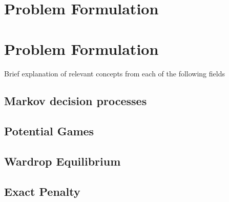 \section{Problem Formulation}\label{problemFormulation}

\section{Problem Formulation}\label{problemFormulation}
Brief explanation of relevant concepts from each of the following fields
\subsection{Markov decision processes}
\subsection{Potential Games}
\subsection{Wardrop Equilibrium}
\subsection{Exact Penalty}

\begin{theorem}\cite[Prop. 5.4.5]{bertsekas1999nonlinear}
\end{theorem}
